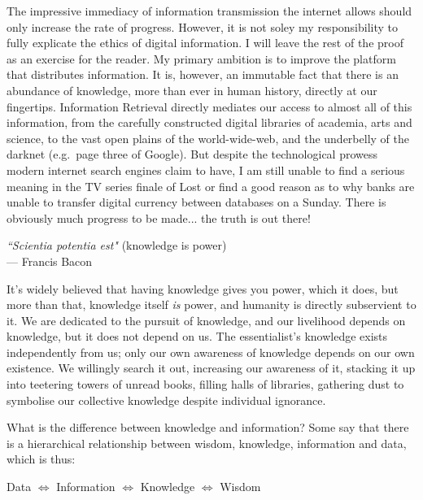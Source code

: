 The impressive immediacy of information transmission the internet allows should only increase the rate of progress. However, it is not soley my responsibility to fully explicate the ethics of digital information. I will leave the rest of the proof as an exercise for the reader. My primary ambition is to improve the platform that distributes information. It is, however, an immutable fact that there is an abundance of knowledge, more than ever in human history, directly at our fingertips. Information Retrieval directly mediates our access to almost all of this information, from the carefully constructed digital libraries of academia, arts and science, to the vast open plains of the world-wide-web, and the underbelly of the darknet (e.g.\ page three of Google). But despite the technological prowess modern internet search engines claim to have, I am still unable to find a serious meaning in the TV series finale of Lost or find a good reason as to why banks are unable to transfer digital currency between databases on a Sunday. There is obviously much progress to be made... the truth is out there!

\begin{center}
    \textit{``Scientia potentia est"} (knowledge is power) 
    \\ --- Francis Bacon
\end{center}

It's widely believed that having knowledge gives you power, which it does, but more than that, knowledge itself \textit{is} power, and humanity is directly subservient to it. We are dedicated to the pursuit of knowledge, and our livelihood depends on knowledge, but it does not depend on us. The essentialist's knowledge exists independently from us; only our own awareness of knowledge depends on our own existence. We willingly search it out, increasing our awareness of it, stacking it up into teetering towers of unread books, filling halls of libraries, gathering dust to symbolise our collective knowledge despite individual ignorance.

What is the difference between knowledge and information? Some say \cite{lucky1989silicon} that there is a hierarchical relationship between wisdom, knowledge, information and data, which is thus:

\begin{center}

Data $\Longleftrightarrow$ Information $\Longleftrightarrow$ Knowledge $\Longleftrightarrow$ Wisdom

\end{center}

